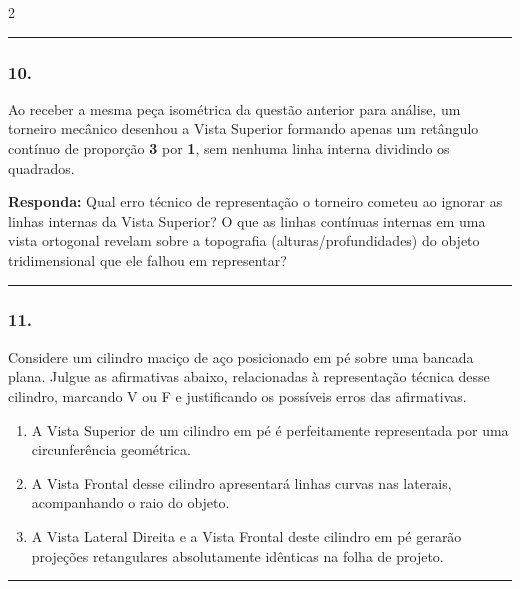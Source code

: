 \documentclass[twoside, 10pt, a4paper]{article}
\newlength{\espacoPreQuestao}\setlength{\espacoPreQuestao}{0.1cm}
\newlength{\espacoQuestao}\setlength{\espacoQuestao}{0.2cm}
\newlength{\espacoAlt}\setlength{\espacoAlt}{0.2cm}
\begin{document}
\begin{multicols*}{2}
\noindent\textcolor{CorLinha}{\rule{\linewidth}{0.5pt}}
\par\vspace{\espacoPreQuestao}
\subsubsection*{10.} Ao receber a mesma peça isométrica da questão anterior para análise, um torneiro mecânico desenhou a Vista Superior formando apenas um retângulo contínuo de proporção \textbf{3} por \textbf{1}, sem nenhuma linha interna dividindo os quadrados.
\begin{boxresponda}
\textbf{Responda:} Qual erro técnico de representação o torneiro cometeu ao ignorar as linhas internas da Vista Superior? O que as linhas contínuas internas em uma vista ortogonal revelam sobre a topografia (alturas/profundidades) do objeto tridimensional que ele falhou em representar?
\end{boxresponda}
\par\vspace{\espacoQuestao}

\noindent\textcolor{CorLinha}{\rule{\linewidth}{0.5pt}} 
\par\vspace{\espacoPreQuestao}
\subsubsection*{11.} Considere um cilindro maciço de aço posicionado em pé sobre uma bancada plana. Julgue as afirmativas abaixo, relacionadas à representação técnica desse cilindro, marcando V ou F e justificando os possíveis erros das afirmativas.
\begin{enumerate}[label=\Roman*., itemsep=\espacoAlt]
\item A Vista Superior de um cilindro em pé é perfeitamente representada por uma circunferência geométrica.
\item A Vista Frontal desse cilindro apresentará linhas curvas nas laterais, acompanhando o raio do objeto.
\item A Vista Lateral Direita e a Vista Frontal deste cilindro em pé gerarão projeções retangulares absolutamente idênticas na folha de projeto.
\end{enumerate}
\par\vspace{\espacoQuestao}

\noindent\textcolor{CorLinha}{\rule{\linewidth}{0.5pt}} 
\par\vspace{\espacoPreQuestao}

\end{multicols*}
\end{document}
